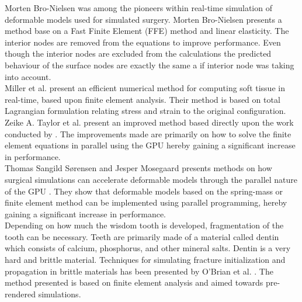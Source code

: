 Morten Bro-Nielsen was among the pioneers
within real-time simulation of deformable models used for simulated
surgery. Morten Bro-Nielsen
 presents a 
method base on a Fast Finite Element (FFE) method and linear
elasticity. The interior nodes
are removed from the equations to improve performance. Even though the
interior nodes are excluded from the calculations the predicted
behaviour of the surface nodes are exactly the same a if interior node
was taking into account. \\

Miller et al.  present an efficient numerical
method for computing soft tissue in real-time, based upon finite
element analysis. Their method is based on total Lagrangian
formulation relating stress and strain to the original configuration. \\

Zeike A. Taylor et al.  present an improved method
based directly upon the work conducted by .
The improvements made are primarily on how to solve the finite element
equations in parallel using the GPU hereby gaining a significant
increase in performance. \\

Thomas Sangild Sørensen and Jesper Mosegaard presents methods on
how surgical simulations can accelerate deformable models through
the parallel nature of the GPU . They show
that deformable models based on the spring-mass or finite element
method can be implemented using parallel programming, hereby gaining a
significant increase in performance. \\


Depending on how much the wisdom tooth is developed, fragmentation of
the tooth can be necessary. Teeth are primarily made of a material
called dentin which consists of calcium, phosphorus, and other
mineral salts. Dentin is a very hard and brittle material.
Techniques for simulating fracture initialization and
propagation in brittle materials has been presented by O'Brian
et al. . The method presented is based on
finite element analysis and aimed towards pre-rendered simulations. \\

